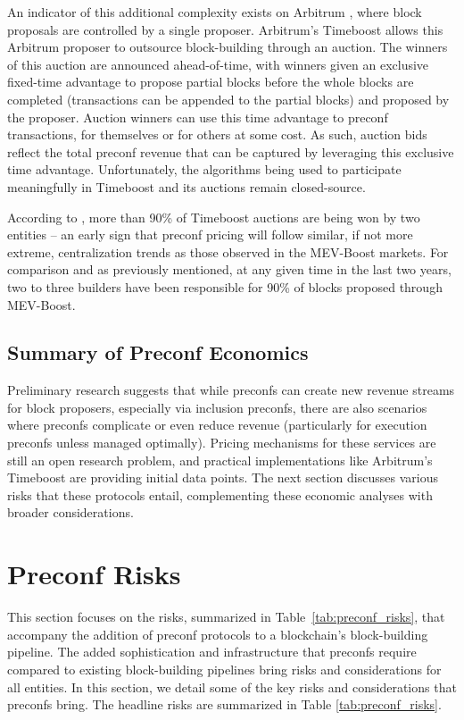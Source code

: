 \documentclass[a4paper]{article}
\theoremstyle{boldstyle}
\begin{document}
    An indicator of this additional complexity exists on Arbitrum \cite{Arbitrum}, where block proposals are controlled by a single proposer. Arbitrum's Timeboost \cite{TimeBoostDocs} allows this Arbitrum proposer to outsource block-building through an auction. The winners of this auction are announced ahead-of-time, with winners given an exclusive fixed-time advantage to propose partial blocks before the whole blocks are completed (transactions can be appended to the partial blocks) and proposed by the proposer. Auction winners can use this time advantage to preconf transactions, for themselves or for others at some cost. As such, auction bids reflect the total preconf revenue that can be captured by leveraging this exclusive time advantage. Unfortunately, the algorithms being used to participate meaningfully in Timeboost and its auctions remain closed-source. 
    
    According to \cite{TimeboostAuctionWinnerBreakdown}, more than 90\% of Timeboost auctions are being won by two entities -- an early sign that preconf pricing will follow similar, if not more extreme, centralization trends as those observed in the MEV-Boost markets. For comparison and as previously mentioned, at any given time in the last two years, two to three builders have been responsible for 90\% of blocks proposed through MEV-Boost\cite{MEVBoostShares}.

    \subsection{Summary of Preconf Economics}

    Preliminary research suggests that while preconfs can create new revenue streams for block proposers, especially via inclusion preconfs, there are also scenarios where preconfs complicate or even reduce revenue (particularly for execution preconfs unless managed optimally). Pricing mechanisms for these services are still an open research problem, and practical implementations like Arbitrum’s Timeboost are providing initial data points. The next section discusses various risks that these protocols entail, complementing these economic analyses with broader considerations.


    \section{Preconf Risks} \label{sec:risk}
    This section focuses on the risks, summarized in Table~\ref{tab:preconf_risks}, that accompany the addition of preconf protocols to a blockchain's block-building pipeline.
    The added sophistication and infrastructure that preconfs require compared to existing block-building pipelines bring risks and considerations for all entities. In this section, we detail some of the key risks and considerations that preconfs bring. The headline risks are summarized in Table \ref{tab:preconf_risks}.
\end{document}
